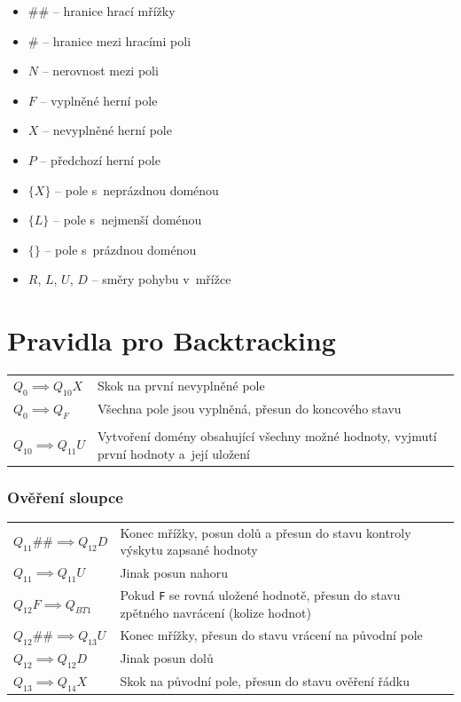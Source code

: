 \begin{itemize}
    \item \(\#\#\) – hranice hrací mřížky
    \item \(\#\) – hranice mezi hracími poli
    \item \(N\) – nerovnost mezi poli
    \item \(F\) – vyplněné herní pole
    \item \(X\) – nevyplněné herní pole
    \item \(P\) – předchozí herní pole
    \item \(\{X\}\) – pole s~neprázdnou doménou
    \item \(\{L\}\) – pole s~nejmenší doménou
    \item \(\{\}\) – pole s~prázdnou doménou
    \item \(R\), \(L\), \(U\), \(D\) – směry pohybu v~mřížce
\end{itemize}

\section{Pravidla pro Backtracking}

\begin{tabular}{@{}p{4cm} p{10.5cm}@{}}
    \(Q_{0} \implies Q_{10}X\) & Skok na první nevyplněné pole \\
    \(Q_{0} \implies Q_{F}\) & Všechna pole jsou vyplněná, přesun do koncového
        stavu \\

    & \\
    \(Q_{10} \implies Q_{11}U\) & Vytvoření domény obsahující všechny možné
        hodnoty, vyjmutí první hodnoty a~její uložení \\
\end{tabular}

\subsubsection*{Ověření sloupce}
\begin{tabular}{@{}p{4cm} p{10.5cm}@{}}
    \(Q_{11}\#\# \implies Q_{12}D\) & Konec mřížky, posun dolů a přesun do
        stavu kontroly výskytu zapsané hodnoty \\
    \(Q_{11} \implies Q_{11}U\) & Jinak posun nahoru \\
    \(Q_{12}F \implies Q_{BT1}\) & Pokud \texttt{F} se rovná uložené hodnotě,
        přesun do stavu zpětného navrácení (kolize hodnot) \\
    \(Q_{12}\#\# \implies Q_{13}U\) & Konec mřížky, přesun do stavu vrácení
        na původní pole \\
    \(Q_{12} \implies Q_{12}D\) & Jinak posun dolů \\
    \(Q_{13} \implies Q_{14}X\) & Skok na původní pole, přesun do stavu
        ověření řádku \\
\end{tabular}


